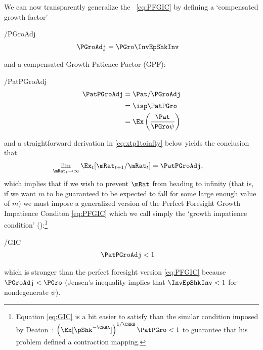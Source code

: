 \documentclass[BufferStockTheory]{subfiles}
\begin{document}
\hypertarget{GIC}{}
\hypertarget{GICI}{}
We can now transparently generalize the \PFGIC~\eqref{eq:PFGIC} by defining a `compensated growth factor' \hypertarget{PGroAdj}{}
\begin{verbatimwrite}{\EqDir/PGroAdj}
  \begin{align}
    \PGroAdj  & =  \PGro \InvEpShkInv \label{eq:PGroAdj}
  \end{align}
\end{verbatimwrite}

and a compensated Growth Patience Pactor (GPF):\hypertarget{GIF}{}
\begin{verbatimwrite}{\EqDir/PatPGroAdj}
  \begin{align}
    \PatPGroAdj  & = \Pat/\PGroAdj
    \\ & = \bar{\isp}\PatPGro  %
    \\ & = \Ex\left(\frac{\Pat}{\PGro \psi}\right)
  \end{align}
\end{verbatimwrite}

and a straightforward derivation in \eqref{eq:xtp1toinfty} below yields the conclusion that
\begin{align*}
  \lim_{\mRat_{t} \rightarrow \infty} \Ex_{t}[\mRat_{t+1}/\mRat_{t}]  & = \PatPGroAdj,
\end{align*}
which implies that if we wish to prevent $\mRat$ from heading to infinity (that is, if we want $m$ to be guaranteed to be expected to fall for some large enough value of $m$) we must impose a generalized version of the Perfect Foresight Growth Impatience Conditon \eqref{eq:PFGIC} which we call simply the `growth impatience condition' 
(\GIC):\footnote{Equation \eqref{eq:GIC} is a bit easier to satisfy than the similar condition imposed by Deaton~\citeyearpar{deatonLiqConstr}: $\left(\Ex[\pShk^{-\CRRA}]\right)^{1/\CRRA} \PatPGro < 1$ to guarantee that his problem defined a contraction mapping.}
\begin{verbatimwrite}{\EqDir/GIC}
  \begin{align}
    \PatPGroAdj  & < 1 \label{eq:GIC}
  \end{align}\end{verbatimwrite}

which is stronger than the perfect foresight version \eqref{eq:PFGIC} because $\PGroAdj < \PGro$ (Jensen's inequality implies that $\InvEpShkInv < 1$ for nondegenerate $\psi$).

\hypertarget{Autarky-Value}{}
\end{document}

